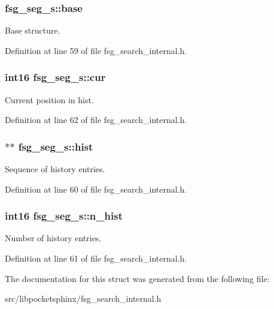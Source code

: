 \subsubsection[{base}]{ fsg\+\_\+seg\+\_\+s\+::base}\label{structfsg__seg__s_a9f977be4814ec887aadb3cea35f96bab}


Base structure. 



Definition at line 59 of file fsg\+\_\+search\+\_\+internal.\+h.

\subsubsection[{cur}]{\setlength{\rightskip}{0pt plus 5cm}int16 fsg\+\_\+seg\+\_\+s\+::cur}\label{structfsg__seg__s_a4b5e46bf79915c97845974e80355ebbe}


Current position in hist. 



Definition at line 62 of file fsg\+\_\+search\+\_\+internal.\+h.

\subsubsection[{hist}]{$\ast$$\ast$ fsg\+\_\+seg\+\_\+s\+::hist}\label{structfsg__seg__s_ae41fbe837c6c921133c91453c58ba68e}


Sequence of history entries. 



Definition at line 60 of file fsg\+\_\+search\+\_\+internal.\+h.

\subsubsection[{n\+\_\+hist}]{\setlength{\rightskip}{0pt plus 5cm}int16 fsg\+\_\+seg\+\_\+s\+::n\+\_\+hist}\label{structfsg__seg__s_aca806a5b88f77803fff4c4c984034515}


Number of history entries. 



Definition at line 61 of file fsg\+\_\+search\+\_\+internal.\+h.



The documentation for this struct was generated from the following file\+:\begin{DoxyCompactItemize}
\item 
src/libpocketsphinx/fsg\+\_\+search\+\_\+internal.\+h\end{DoxyCompactItemize}
